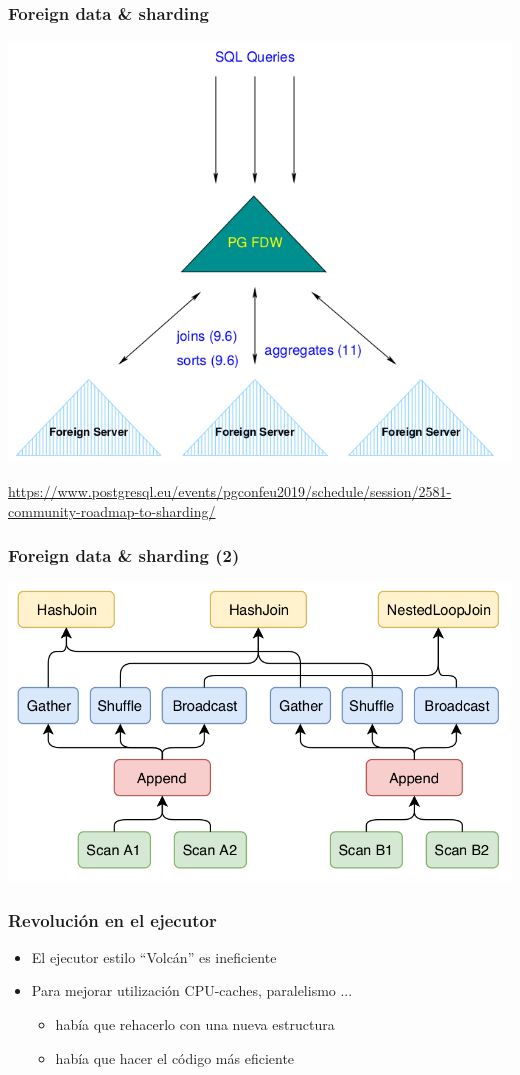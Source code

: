 \begin{frame}
\frametitle{Foreign data \& sharding}

\includegraphics{sharding.png}

\footnotesize\url{https://www.postgresql.eu/events/pgconfeu2019/schedule/session/2581-community-roadmap-to-sharding/}
\end{frame}

\begin{frame}
\frametitle{Foreign data \& sharding (2)}

\includegraphics{sharded-plan.png}

\end{frame}

\begin{frame}
\frametitle{Revolución en el ejecutor}

\begin{itemize}
\item El ejecutor estilo ``Volcán'' es ineficiente
\item Para mejorar utilización CPU-caches, paralelismo ...
\begin{itemize}
\item había que rehacerlo con una nueva estructura
\item había que hacer el código más eficiente
\end{itemize}
\end{itemize}

\end{frame}

